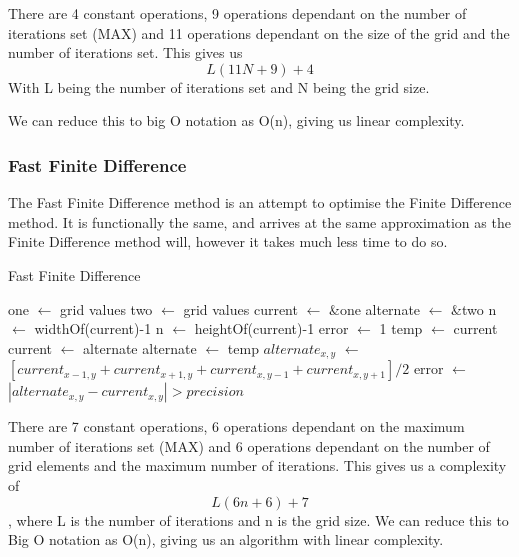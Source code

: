 \documentclass[aps,twocolumn,pre,nofootinbib,10pt]{revtex4-1}
\newcommand*\Let[2]{\State #1 $\gets$ #2}
\begin{document}
There are 4 constant operations, 9 operations dependant on the number of iterations set (MAX) and 11 operations dependant on the size of the grid and the number of iterations set. This gives us \[L(11N+9)+4\] With L being the number of iterations set and N being the grid size.

We can reduce this to big O notation as O(n), giving us linear complexity.

\subsubsection{Fast Finite Difference}

The Fast Finite Difference method is an attempt to optimise the Finite Difference method. It is functionally the same, and arrives at the same approximation as the Finite Difference method will, however it takes much less time to do so.

\begin{algorithm}
    \caption{Fast Finite Difference}
    \label{alg:ffd}
    \begin{algorithmic}[1]
            \Let{one}{grid values}
            \Let{two}{grid values}
            \Let{*current}{\&one}
            \Let{*alternate}{\&two}
            \Let{n}{widthOf(current)-1}
            \Let{n}{heightOf(current)-1}
                \Let{error}{1}
                \Let{temp}{current}
                \Let{current}{alternate}
                \Let{alternate}{temp}
                            \Let{$alternate_{x,y}$}{$[{current_{x-1,y}+current_{x+1,y}+current_{x,y-1}+current_{x,y+1}}] / {2}$}
                                \Let{error}{$|alternate_{x,y} - current_{x,y}| > precision$}
                            \EndIf
                        \EndIf
                    \EndFor
                \EndFor
            \EndFor
        \EndFunction
    \end{algorithmic}
\end{algorithm}

There are 7 constant operations, 6 operations dependant on the maximum number of iterations set (MAX) and 6 operations dependant on the number of grid elements and the maximum number of iterations. This gives us a complexity of \[L(6n + 6) + 7\], where L is the number of iterations and n is the grid size. We can reduce this to Big O notation as O(n), giving us an algorithm with linear complexity.
\end{document}
